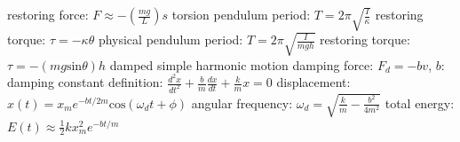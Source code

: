 \documentclass[10pt,landscape]{article}
\newcommand{\spc}{\hspace*{1em}}
\begin{document}
\begin{multicols*}{3}
\spc restoring force: $F\approx -(\frac{mg}{L})s$
\newline \newline
torsion pendulum
\newline
\spc period: $T=2 \pi \sqrt{\frac{I}{\kappa }}$
\newline
\spc restoring torque: $\tau =-\kappa \theta $
\newline \newline
physical pendulum
\newline
\spc period: $T=2 \pi \sqrt{\frac{I}{mgh}}$
\newline
\spc restoring torque: $\tau =-(mg\mathrm{sin}\theta )h$
\newline \newline
damped simple harmonic motion
\newline
\spc damping force: $F_d=-bv$, $b$: damping constant
\newline
\spc definition: $\frac{d^2x}{dt^2}+\frac{b}{m}\frac{dx}{dt}+\frac{k}{m}x=0$
\newline
\spc \spc displacement: $x(t)=x_me^{-bt/2m}\mathrm{cos}(\omega _dt+ \phi)$
\newline
\spc angular frequency: $\omega_d=\sqrt{\frac{k}{m}-\frac{b^2}{4m^2}}$
\newline
\spc total energy: $E(t)\approx \frac{1}{2}kx_m^2e^{-bt/m}$


\end{multicols*}
\end{document}
